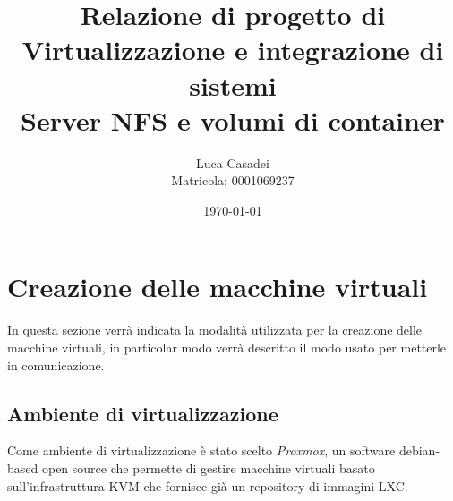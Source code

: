 \documentclass[a4paper]{article}
\title{Relazione di progetto di Virtualizzazione e integrazione di sistemi\\
\textbf{Server NFS e volumi di container}}
\date{\today}
\author{Luca Casadei\\Matricola: 0001069237}
\begin{document}
\maketitle

\tableofcontents

\section{Creazione delle macchine virtuali}
In questa sezione verrà indicata la modalità utilizzata per la creazione delle macchine virtuali, 
in particolar modo verrà descritto il modo usato per metterle in comunicazione.
\subsection{Ambiente di virtualizzazione}
Come ambiente di virtualizzazione è stato scelto \textit{Proxmox}, un software debian-based open source che permette di gestire macchine virtuali basato
sull'infrastruttura \gls{KVM} che fornisce già un repository di immagini \gls{LXC}.


\printglossaries
\end{document}
